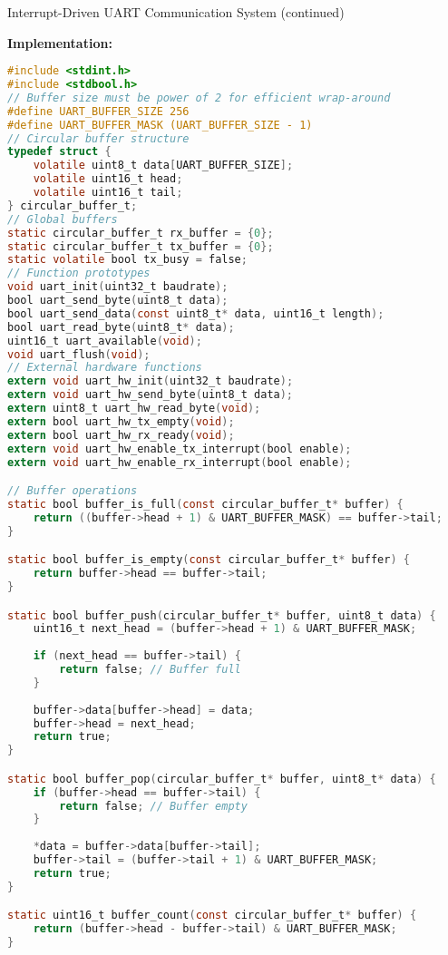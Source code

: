 \begin{example2}{Interrupt-Driven UART Communication System (continued)}

\textbf{Implementation:}

\begin{lstlisting}[language=C, style=basesmol]
#include <stdint.h>
#include <stdbool.h>
// Buffer size must be power of 2 for efficient wrap-around
#define UART_BUFFER_SIZE 256
#define UART_BUFFER_MASK (UART_BUFFER_SIZE - 1)
// Circular buffer structure
typedef struct {
    volatile uint8_t data[UART_BUFFER_SIZE];
    volatile uint16_t head;
    volatile uint16_t tail;
} circular_buffer_t;
// Global buffers
static circular_buffer_t rx_buffer = {0};
static circular_buffer_t tx_buffer = {0};
static volatile bool tx_busy = false;
// Function prototypes
void uart_init(uint32_t baudrate);
bool uart_send_byte(uint8_t data);
bool uart_send_data(const uint8_t* data, uint16_t length);
bool uart_read_byte(uint8_t* data);
uint16_t uart_available(void);
void uart_flush(void);
// External hardware functions
extern void uart_hw_init(uint32_t baudrate);
extern void uart_hw_send_byte(uint8_t data);
extern uint8_t uart_hw_read_byte(void);
extern bool uart_hw_tx_empty(void);
extern bool uart_hw_rx_ready(void);
extern void uart_hw_enable_tx_interrupt(bool enable);
extern void uart_hw_enable_rx_interrupt(bool enable);

// Buffer operations
static bool buffer_is_full(const circular_buffer_t* buffer) {
    return ((buffer->head + 1) & UART_BUFFER_MASK) == buffer->tail;
}

static bool buffer_is_empty(const circular_buffer_t* buffer) {
    return buffer->head == buffer->tail;
}

static bool buffer_push(circular_buffer_t* buffer, uint8_t data) {
    uint16_t next_head = (buffer->head + 1) & UART_BUFFER_MASK;
    
    if (next_head == buffer->tail) {
        return false; // Buffer full
    }
    
    buffer->data[buffer->head] = data;
    buffer->head = next_head;
    return true;
}

static bool buffer_pop(circular_buffer_t* buffer, uint8_t* data) {
    if (buffer->head == buffer->tail) {
        return false; // Buffer empty
    }
    
    *data = buffer->data[buffer->tail];
    buffer->tail = (buffer->tail + 1) & UART_BUFFER_MASK;
    return true;
}

static uint16_t buffer_count(const circular_buffer_t* buffer) {
    return (buffer->head - buffer->tail) & UART_BUFFER_MASK;
}
\end{lstlisting}
\end{example2}


